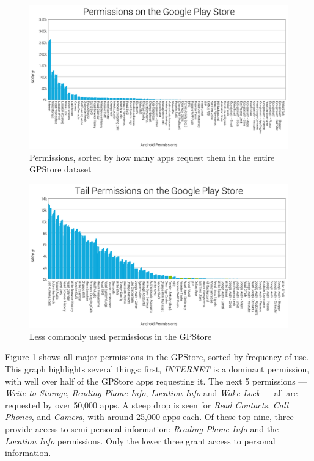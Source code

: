 \begin{figure}[h]
\begin{center}
\includegraphics[width=1.0\columnwidth]{figs/AllPermissions}
\caption{Permissions, sorted by how many apps request them in the entire GPStore dataset}
\label{fig:allpermissions}
\end{center}
\end{figure}

\begin{figure}[h]
\begin{center}
\includegraphics[width=1.0\columnwidth]{figs/AllPermissions_Tail}
\caption{Less commonly used permissions in the GPStore}
\label{fig:tailpermissions}
\end{center}
\end{figure}

Figure \ref{fig:allpermissions} shows all major permissions in the GPStore, sorted by frequency of use. This graph highlights several things: first, \textit{INTERNET} is a dominant permission, with well over half of the GPStore apps requesting it. The next 5 permissions --- \textit{Write to Storage}, \textit{Reading Phone Info}, \textit{Location Info} and \textit{Wake Lock} --- all are requested by over 50,000 apps. A steep drop is seen for \textit{Read Contacts}, \textit{Call Phones}, and \textit{Camera}, with around 25,000 apps each. Of these top nine, three provide access to semi-personal information: \textit{Reading Phone Info} and the \textit{Location Info} permissions. Only the lower three grant access to personal information. 

